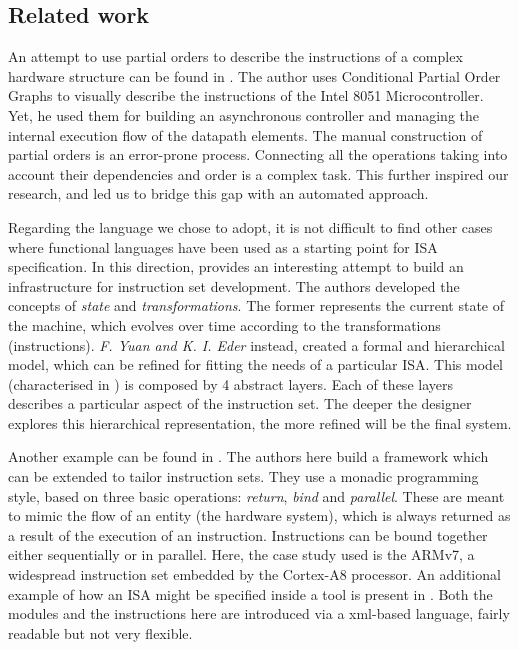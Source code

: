 \documentclass[conference]{IEEEtran}
\begin{document}
\subsection{Related work}

An attempt to use partial orders to describe the instructions of a complex hardware structure can be found in \cite{maxPhd}. The author uses Conditional Partial Order Graphs to visually describe the instructions of the Intel 8051 Microcontroller. Yet, he used them for building an asynchronous controller and managing the internal execution flow of the datapath elements. The manual construction of partial orders is an error-prone process. Connecting all the operations taking into account their dependencies and order is a complex task. This further inspired our research, and led us to bridge this gap with an automated approach.

Regarding the language we chose to adopt, it is not difficult to find other cases where functional languages have been used as a starting point for ISA specification. In this direction, \cite{isaFunc} provides an interesting attempt to build an infrastructure for instruction set development. The authors developed the concepts of \textit{state} and \textit{transformations}. The former represents the current state of the machine, which evolves over time according to the transformations (instructions). \textit{F. Yuan and K. I. Eder} instead, created a formal and hierarchical model, which can be refined for fitting the needs of a particular ISA. This model (characterised in \cite{isaEventB}) is composed by 4 abstract layers. Each of these layers describes a particular aspect of the instruction set. The deeper the designer explores this hierarchical representation, the more refined will be the final system.

Another example can be found in \cite{armv7}. The authors here build a framework which can be extended to tailor instruction sets. They use a monadic programming style, based on three basic operations: \textit{return}, \textit{bind} and \textit{parallel}. These are meant to mimic the flow of an entity (the hardware system), which is always returned as a result of the execution of an instruction. Instructions can be bound together either sequentially or in parallel. Here, the case study used is the ARMv7, a widespread instruction set embedded by the Cortex-A8 processor. An additional example of how an ISA might be specified inside a tool is present in \cite{isaXml}. Both the modules and the instructions here are introduced via a xml-based language, fairly readable but not very flexible.
\end{document}
